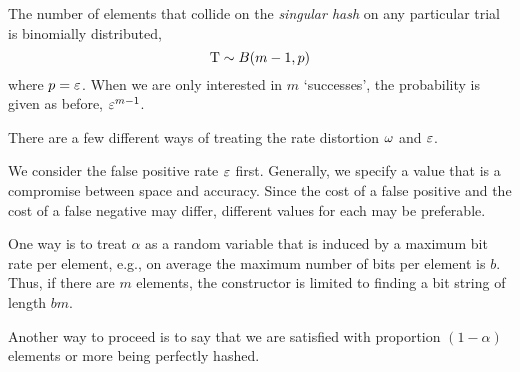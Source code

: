 \documentclass[ ../main.tex]{subfiles}
\begin{document}
The number of elements that collide on the \emph{singular hash} on any particular trial is binomially distributed,
\begin{equation}
	\mathrm{T} \sim B(m-1,p)
\end{equation}
where $p = \varepsilon$.
When we are only interested in $m$ `successes', the probability is given as before, $\varepsilon^{m-1}$.

There are a few different ways of treating the rate distortion $\omega$ and $\varepsilon$.

We consider the false positive rate $\varepsilon$ first.
Generally, we specify a value that is a compromise between space and accuracy.
Since the cost of a false positive and the cost of a false negative may differ, different values for each may be preferable.

One way is to treat $\alpha$ as a random variable that is induced by a maximum bit rate per element, e.g., on average the maximum number of bits per element is $b$.
Thus, if there are $m$ elements, the constructor is limited to finding a bit string of length $b m$.

Another way to proceed is to say that we are satisfied with proportion $(1-\alpha)$ elements or more being perfectly hashed.
\end{document}
